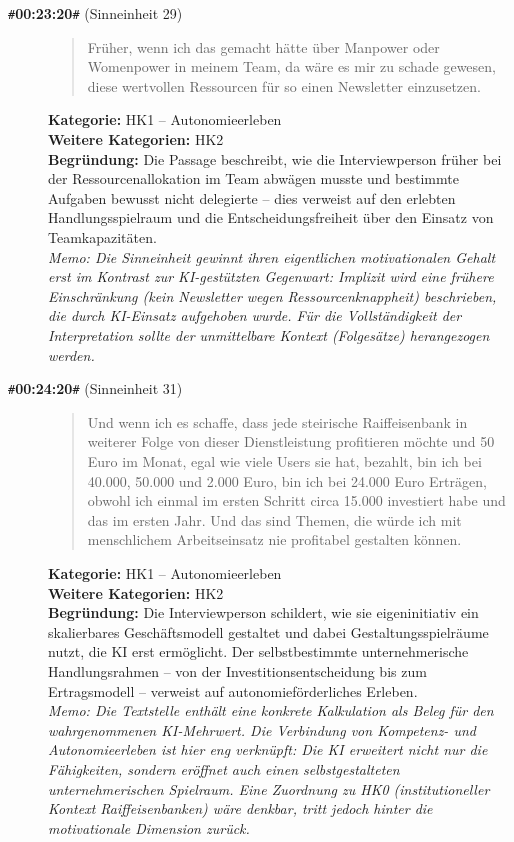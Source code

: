 \begin{description}
  \item[\texttt{\#}\textbf{00:23:20}\texttt{\#} (Sinneinheit 29)]
  \begin{quote}
  Früher, wenn ich das gemacht hätte über Manpower oder Womenpower in meinem Team, da wäre es mir zu schade gewesen, diese wertvollen Ressourcen für so einen Newsletter einzusetzen.
  \end{quote}
  \textbf{Kategorie:} HK1 -- Autonomieerleben\\
  \textbf{Weitere Kategorien:} HK2\\
  \textbf{Begr\"undung:} Die Passage beschreibt, wie die Interviewperson früher bei der Ressourcenallokation im Team abwägen musste und bestimmte Aufgaben bewusst nicht delegierte – dies verweist auf den erlebten Handlungsspielraum und die Entscheidungsfreiheit über den Einsatz von Teamkapazitäten.
  \\\textit{Memo: Die Sinneinheit gewinnt ihren eigentlichen motivationalen Gehalt erst im Kontrast zur KI-gestützten Gegenwart: Implizit wird eine frühere Einschränkung (kein Newsletter wegen Ressourcenknappheit) beschrieben, die durch KI-Einsatz aufgehoben wurde. Für die Vollständigkeit der Interpretation sollte der unmittelbare Kontext (Folgesätze) herangezogen werden.}
\end{description}
\medskip

\begin{description}
  \item[\texttt{\#}\textbf{00:24:20}\texttt{\#} (Sinneinheit 31)]
  \begin{quote}
  Und wenn ich es schaffe, dass jede steirische Raiffeisenbank in weiterer Folge von dieser Dienstleistung profitieren möchte und 50 Euro im Monat, egal wie viele Users sie hat, bezahlt, bin ich bei 40.000, 50.000 und 2.000 Euro, bin ich bei 24.000 Euro Erträgen, obwohl ich einmal im ersten Schritt circa 15.000 investiert habe und das im ersten Jahr. Und das sind Themen, die würde ich mit menschlichem Arbeitseinsatz nie profitabel gestalten können.
  \end{quote}
  \textbf{Kategorie:} HK1 -- Autonomieerleben\\
  \textbf{Weitere Kategorien:} HK2\\
  \textbf{Begr\"undung:} Die Interviewperson schildert, wie sie eigeninitiativ ein skalierbares Geschäftsmodell gestaltet und dabei Gestaltungsspielräume nutzt, die KI erst ermöglicht. Der selbstbestimmte unternehmerische Handlungsrahmen – von der Investitionsentscheidung bis zum Ertragsmodell – verweist auf autonomieförderliches Erleben.
  \\\textit{Memo: Die Textstelle enthält eine konkrete Kalkulation als Beleg für den wahrgenommenen KI-Mehrwert. Die Verbindung von Kompetenz- und Autonomieerleben ist hier eng verknüpft: Die KI erweitert nicht nur die Fähigkeiten, sondern eröffnet auch einen selbstgestalteten unternehmerischen Spielraum. Eine Zuordnung zu HK0 (institutioneller Kontext Raiffeisenbanken) wäre denkbar, tritt jedoch hinter die motivationale Dimension zurück.}
\end{description}
\medskip

